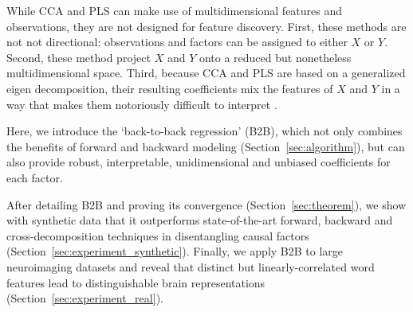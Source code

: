 While CCA and PLS can make use
of multidimensional features and observations, they are not designed
for feature discovery. First, these methods are not not directional: observations
and factors can be assigned to either $X$ or $Y$. Second, these method project $X$
and $Y$ onto a reduced but nonetheless multidimensional space. Third, because
CCA and PLS are based on a generalized eigen decomposition, their resulting
coefficients mix the features of $X$ and $Y$ in a way that makes them notoriously difficult to
interpret \citep{lebart1995statistique}.

Here, we introduce the `back-to-back regression' (B2B), which not only combines
the benefits of forward and backward modeling (Section~\ref{sec:algorithm}), but
can also provide robust, interpretable, unidimensional and unbiased coefficients for
each factor.

After detailing B2B and proving its convergence
(Section~\ref{sec:theorem}), we show with synthetic data that it outperforms
state-of-the-art forward, backward and cross-decomposition techniques in
disentangling causal factors (Section~\ref{sec:experiment_synthetic}). Finally,
we apply B2B to large neuroimaging datasets and reveal that distinct but
linearly-correlated word features lead to distinguishable brain representations
(Section~\ref{sec:experiment_real}).
